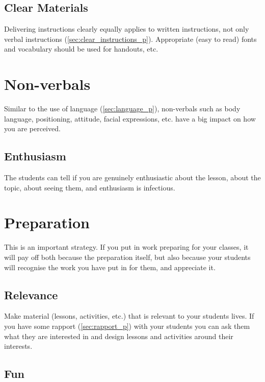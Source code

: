 \documentclass[12pt]{report}
\begin{document}
\subsection{Clear Materials}
\label{sec:clear_materials_p}

Delivering instructions clearly equally applies to written instructions, not only verbal instructions (\ref{sec:clear_instructions_p}). Appropriate (easy to read) fonts and vocabulary should be used for handouts, etc.



\section{Non-verbals}
\label{sec:non_verbals_p}

Similar to the use of language (\ref{sec:language_p}), non-verbals such as body language, positioning, attitude, facial expressions, etc. have a big impact on how you are perceived. 

\subsection{Enthusiasm}
\label{sec:enthusiasm_p}

The students can tell if you are genuinely enthusiastic about the lesson, about the topic, about seeing them, and enthusiasm is infectious.



\section{Preparation}
\label{sec:preparation_p}

This is an important strategy. If you put in work preparing for your classes, it will pay off both because the preparation itself, but also because your students will recognise the work you have put in for them, and appreciate it. 

\subsection{Relevance}
\label{sec:relevance_p}

Make material (lessons, activities, etc.) that is relevant to your students lives. If you have some rapport (\ref{sec:rapport_p}) with your students you can ask them what they are interested in and design lessons and activities around their interests.

\subsection{Fun}
\label{sec:fun_p}
\end{document}
